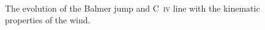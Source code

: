\documentclass[preprint, a4paper, 11pt]{aastex}
\begin{document}
\begin{figure} %
\mbox{
\quad
{}   
}
\caption{The evolution of the Balmer jump and C~\textsc{iv} line with the kinematic properties
of the wind. 
}
\label{jump}
\end{figure}









\end{document}
